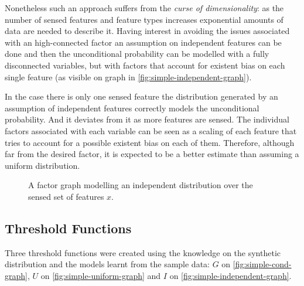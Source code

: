 Nonetheless such an approach suffers from
the \emph{curse of dimensionality}: as the number of sensed features and feature
types increases exponential amounts of data are needed to describe it.
Having interest in avoiding the issues associated with an high-connected factor
an assumption on independent features can be done and then the unconditional
probability can be modelled with a fully disconnected variables, but with
factors that account for existent bias on each single feature (as visible on
graph in \autoref{fig:simple-independent-graph}).

In the case there is only one sensed feature the distribution generated by an
assumption of independent features correctly models the unconditional
probability. And it deviates from it as more features are sensed.
The individual factors associated with each variable can be seen as a scaling of
each feature that tries to account for a possible existent bias on each
of them. Therefore, although far from the desired factor, it is expected to be a
better estimate than assuming a uniform distribution.

\begin{figure}[h]
\centering
{}
\caption{\label{fig:simple-independent-graph}A factor graph modelling an
         independent distribution over the sensed set of features $x$.}
\end{figure}



\subsection{Threshold Functions}
Three threshold functions were created using the knowledge on the synthetic
distribution and the models learnt from the sample data:
$G$ on \autoref{fig:simple-cond-graph},
$U$ on \autoref{fig:simple-uniform-graph} and
$I$ on \autoref{fig:simple-independent-graph}.

